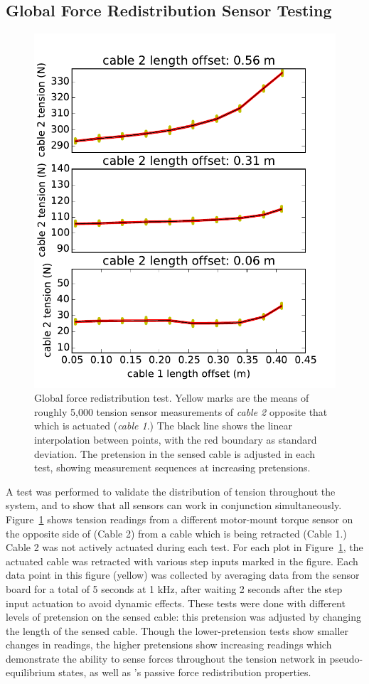 \subsection{Global Force Redistribution Sensor Testing}

\begin{figure}[thpb]
      \centering
      \includegraphics[width=0.55\columnwidth]{tex/img/sensor2_original}
      \caption{Global force redistribution test. Yellow marks are the means of roughly 5,000 tension sensor measurements of \emph{cable 2} opposite that which is actuated (\emph{cable 1}.) The black line shows the linear interpolation between points, with the red boundary as standard deviation. The pretension in the sensed cable is adjusted in each test, showing measurement sequences at increasing pretensions.}
      \label{fig:sensor2data_forcedistribution}
\end{figure}

A test was performed to validate the distribution of tension throughout the system, and to show that all sensors can work in conjunction simultaneously.
Figure~\ref{fig:sensor2data_forcedistribution} shows tension readings from a different motor-mount torque sensor on the opposite side of \SB{} (Cable 2) from a cable which is being retracted (Cable 1.)
Cable 2 was not actively actuated during each test.
For each plot in Figure~\ref{fig:sensor2data_forcedistribution}, the actuated cable was retracted with various step inputs marked in the figure.
Each data point in this figure (yellow) was collected by averaging data from the sensor board for a total of 5 seconds at 1 kHz, after waiting 2 seconds after the step input actuation to avoid dynamic effects.
These tests were done with different levels of pretension on the sensed cable: this pretension was adjusted by changing the length of the sensed cable.
Though the lower-pretension tests show smaller changes in readings, the higher pretensions show increasing readings which demonstrate the ability to sense forces throughout the tension network in pseudo-equilibrium states, as well as \SB{}'s passive force redistribution properties.

